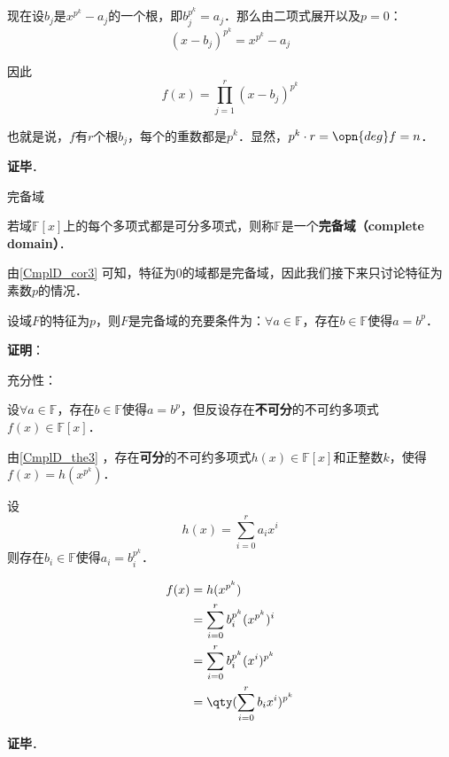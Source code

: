 现在设$b_j$是$x^{p^k}-a_j$的一个根，即$b_j^{p^k}=a_j$．那么由二项式展开以及$p=0$：
\begin{equation}
(x-b_j)^{p^k} = x^{p^k}-a_j
\end{equation}

因此
\begin{equation}
f(x) = \prod_{j=1}^{r} (x-b_j)^{p^k}
\end{equation}

也就是说，$f$有$r$个根$b_j$，每个的重数都是$p^k$．显然，$p^k\cdot r = \opn{deg}f = n$．

\textbf{证毕}．


\begin{definition}{完备域}

若域$\mathbb{F}[x]$上的每个多项式都是可分多项式，则称$\mathbb{F}$是一个\textbf{完备域（complete domain）}．

\end{definition}

由\autoref{CmplD_cor3} 可知，特征为$0$的域都是完备域，因此我们接下来只讨论特征为素数$p$的情况．




\begin{theorem}{}
设域$F$的特征为$p$，则$F$是完备域的充要条件为：$\forall a\in\mathbb{F}$，存在$b\in\mathbb{F}$使得$a=b^p$．
\end{theorem}

\textbf{证明}：

充分性：

设$\forall a\in\mathbb{F}$，存在$b\in\mathbb{F}$使得$a=b^p$，但反设存在\textbf{不可分}的不可约多项式$f(x)\in\mathbb{F}[x]$．

由\autoref{CmplD_the3} ，存在\textbf{可分}的不可约多项式$h(x)\in\mathbb{F}[x]$和正整数$k$，使得$f(x)=h(x^{p^k})$．

设
\begin{equation}
h(x) = \sum_{i=0}^r a_ix^i
\end{equation}
则存在$b_i\in\mathbb{F}$使得$a_i=b_i^{p^k}$．

\begin{equation}
\begin{aligned}
f(x)&=h(x^{p^k}) \\
&=\sum_{i=0}^r b_i^{p^k}(x^{p^k})^i\\
&=\sum_{i=0}^r b_i^{p^k}(x^{i})^{p^k}\\
&=\qty(\sum_{i=0}^r b_ix^i)^{p^k}
\end{aligned}
\end{equation}



\textbf{证毕}．
























